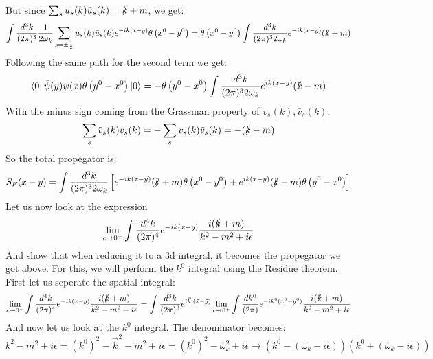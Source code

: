 \documentclass{article}
\begin{document}
But since $\sum_s u_s(k)\bar{u}_s(k) = \slashed{k} + m$, we get:
\begin{equation}
    \int \frac{d^3k}{(2\pi)^3} \frac{1}{2\omega_k}\sum_{s=\pm\frac{1}{2}}
        u_s(k) \bar{u}_s(k)e^{-ik(x - y)}
    \theta\left(x^0 - y^0\right) = 
    \theta\left(x^0 - y^0\right)
    \int \frac{d^3k}{(2\pi)^32\omega_k}
        e^{-ik(x - y)} (\slashed{k} + m)
\end{equation}
Following the same path for the second term we get:
\begin{equation}
    \bra{0}\bar{\psi}(y)\psi(x)\theta\left(y^0 - x^0\right)\ket{0} =
    - \theta\left(y^0 - x^0\right)
    \int \frac{d^3k}{(2\pi)^32\omega_k}
        e^{ik(x - y)} (\slashed{k} - m)
\end{equation}
With the minus sign coming from the Grassman property of $v_s(k), \bar{v}_s(k)$:
\begin{equation}
    \sum_s \bar{v}_s(k) v_s(k) = - \sum_s v_s(k) \bar{v}_s(k) = - (\slashed{k} - m)
\end{equation}
So the total propegator is:
\begin{equation}
\label{eq:feynman-propagator}
    S_F(x-y) = \int \frac{d^3k}{(2\pi)^32\omega_k}
    \left[
        e^{-ik(x - y)}(\slashed{k} + m)\theta\left(x^0 - y^0\right) +
        e^{ik(x - y)}(\slashed{k} - m)\theta\left(y^0 - x^0\right)
    \right]
\end{equation}
Let us now look at the expression
\begin{equation}
    \lim_{\epsilon\rightarrow0^{+}} \int \frac{d^4k}{(2\pi)^4} e^{-ik(x-y)}\frac{i(\slashed{k} +m )}{k^2 - m^2 + i\epsilon}
\end{equation}
And show that when reducing it to a 3d integral, it becomes the propegator we got above. For this, we will perform the $k^0$ integral using the Residue theorem. First let us seperate the spatial integral:
\begin{equation}
    \lim_{\epsilon\rightarrow0^{+}} \int \frac{d^4k}{(2\pi)^4} e^{-ik(x-y)}\frac{i(\slashed{k} +m )}{k^2 - m^2 + i\epsilon} = 
    \int \frac{d^3k}{(2\pi)^3} e^{i\vec{k}\cdot(\vec{x} - \vec{y})} \lim_{\epsilon\rightarrow0^{+}} \int \frac{dk^0}{(2\pi)} e^{-ik^0(x^0-y^0)}\frac{i(\slashed{k} +m )}{k^2 - m^2 + i\epsilon}
\end{equation}
And now let us look at the $k^0$ integral. The denominator becomes:
\begin{equation}
    k^2 - m^2 + i\epsilon = \left(k^0\right)^2 - \vec{k}^2 - m^2 + i\epsilon = \left(k^0\right)^2 - \omega_k^2 + i\epsilon \rightarrow \left(k^0 - (\omega_k - i\epsilon)\right)\left(k^0 + (\omega_k - i\epsilon)\right)
\end{equation}
\end{document}
